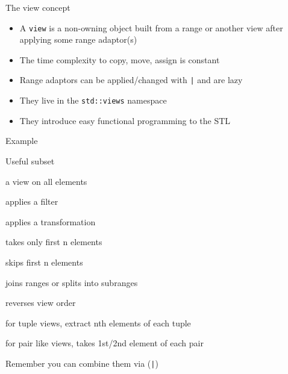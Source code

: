 \begin{frame}[fragile]
  \begin{block}{The view concept}
    \begin{itemize}
    \item A \texttt{view} is a non-owning object built from a range or another view after applying some range adaptor(s)
    \item The time complexity to copy, move, assign is constant
    \item Range adaptors can be applied/changed with \texttt{|} and are lazy
    \item They live in the \texttt{std::views} namespace
    \item They introduce easy functional programming to the STL
    \end{itemize}
  \end{block}
  \begin{exampleblock}{Example}
    { \scriptsize
    }
  \end{exampleblock}
\end{frame}

\begin{frame}[fragile]
  \begin{block}{Useful subset}
    \begin{description}
    \item[all] a view on all elements
    \item[filter] applies a filter
    \item[transform] applies a transformation
    \item[take] takes only first n elements
    \item[drop] skips first n elements
    \item[join/split] joins ranges or splits into subranges
    \item[reverse] reverses view order
    \item[elements] for tuple views, extract nth elements of each tuple
    \item[keys/values] for pair like views, takes 1st/2nd element of each pair
    \end{description}
  \end{block}
  Remember you can combine them via (\texttt{|})
\end{frame}

